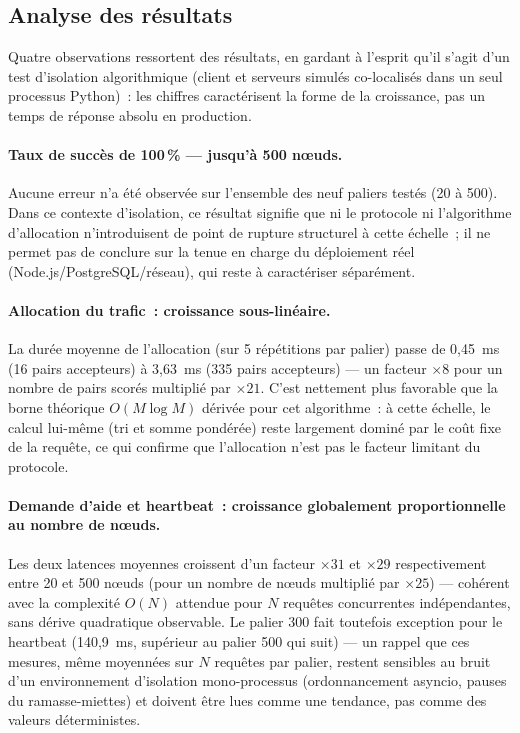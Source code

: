 \subsection{Analyse des résultats}

Quatre observations ressortent des résultats, en gardant à l'esprit qu'il s'agit d'un test d'isolation algorithmique (client et serveurs simulés co-localisés dans un seul processus Python)~: les chiffres caractérisent la forme de la croissance, pas un temps de réponse absolu en production.

\paragraph{Taux de succès de 100\,\% — jusqu'à 500 nœuds.} Aucune erreur n'a été observée sur l'ensemble des neuf paliers testés (20 à 500). Dans ce contexte d'isolation, ce résultat signifie que ni le protocole ni l'algorithme d'allocation n'introduisent de point de rupture structurel à cette échelle~; il ne permet pas de conclure sur la tenue en charge du déploiement réel (Node.js/PostgreSQL/réseau), qui reste à caractériser séparément.

\paragraph{Allocation du trafic~: croissance sous-linéaire.} La durée moyenne de l'allocation (sur 5 répétitions par palier) passe de 0{,}45~ms (16 pairs accepteurs) à 3{,}63~ms (335 pairs accepteurs) — un facteur $\times 8$ pour un nombre de pairs scorés multiplié par $\times 21$. C'est nettement plus favorable que la borne théorique $O(M \log M)$ dérivée pour cet algorithme~: à cette échelle, le calcul lui-même (tri et somme pondérée) reste largement dominé par le coût fixe de la requête, ce qui confirme que l'allocation n'est pas le facteur limitant du protocole.

\paragraph{Demande d'aide et heartbeat~: croissance globalement proportionnelle au nombre de nœuds.} Les deux latences moyennes croissent d'un facteur $\times 31$ et $\times 29$ respectivement entre 20 et 500 nœuds (pour un nombre de nœuds multiplié par $\times 25$) — cohérent avec la complexité $O(N)$ attendue pour $N$ requêtes concurrentes indépendantes, sans dérive quadratique observable. Le palier 300 fait toutefois exception pour le heartbeat (140{,}9~ms, supérieur au palier 500 qui suit) — un rappel que ces mesures, même moyennées sur $N$ requêtes par palier, restent sensibles au bruit d'un environnement d'isolation mono-processus (ordonnancement asyncio, pauses du ramasse-miettes) et doivent être lues comme une tendance, pas comme des valeurs déterministes.


